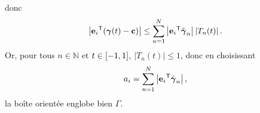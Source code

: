 donc
\begin{equation*}
	\left| {\mathbf{e}_i} ^\mathsf{T} {\left( \boldsymbol{\gamma}(t) - \mathbf{c} \right)} \right| 
	\leq \sum_{n=1}^{N} \left|{\mathbf{e}_i} ^\mathsf{T} {\hat{\boldsymbol{\gamma}}_n}\right| \left| T_n(t) \right|.
\end{equation*}
Or, pour tous $n \in \mathbb{N}$ et $t \in \left[ -1, 1 \right]$, $\left| T_n(t) \right| \leq 1$, 
donc en choisissant
\begin{equation}
	a_i = \sum_{n=1}^{N} \left|{\mathbf{e}_i} ^\mathsf{T} {\hat{\boldsymbol{\gamma}}_n}\right|,
\end{equation}
la boîte orientée englobe bien $\Gamma$.


